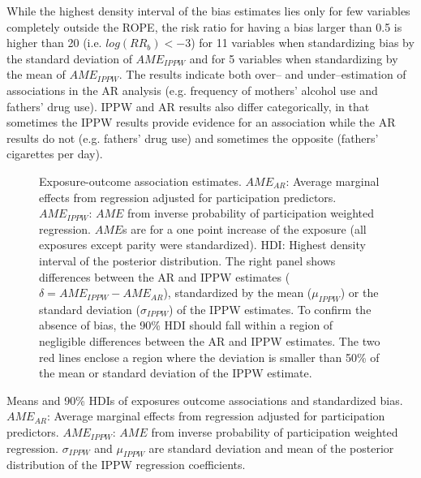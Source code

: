 \documentclass[12pt]{article}
\begin{document}
While the highest density interval of the bias estimates lies only for few variables completely outside the ROPE, the risk ratio for having a bias larger than 0.5 is higher than 20 (i.e. $log(RR_b) < -3$) for 11 variables when standardizing bias by the standard deviation of $AME_{IPPW}$ and for 5 variables when standardizing by the mean of $AME_{IPPW}$. The results indicate both over-- and under--estimation of associations in the AR analysis (e.g. frequency of mothers' alcohol use and fathers' drug use). IPPW and AR results also differ categorically, in that sometimes the IPPW results provide evidence for an association while the AR results do not (e.g. fathers' drug use) and sometimes the opposite (fathers' cigarettes per day). 

\begin{figure}
	\centering
	\caption{Exposure-outcome association estimates. $AME_{AR}$: Average marginal effects from regression adjusted for participation predictors. $AME_{IPPW}$: $AME$ from inverse probability of participation weighted regression. $AME$s are for a one point increase of the exposure (all exposures except parity were standardized). HDI: Highest density interval of the posterior distribution. The right panel shows differences between the AR and IPPW estimates ($\delta = AME_{IPPW}-AME_{AR}$), standardized by the mean ($\mu_{IPPW}$) or the standard deviation ($\sigma_{IPPW}$) of the IPPW estimates. To confirm the absence of bias, the 90\% HDI should fall within a region of negligible differences between the AR and IPPW estimates. The two red lines enclose a region where the deviation is smaller than 50\% of the mean or standard deviation of the IPPW estimate.}
	\label{fig:estimates}
\end{figure}


\begin{table}
	\caption{Means and 90\% HDIs of exposures outcome associations and standardized bias.
		$AME_{AR}$: Average marginal effects from regression adjusted for participation predictors. $AME_{IPPW}$: $AME$ from inverse probability of participation weighted regression. $\sigma_{IPPW}$ and $\mu_{IPPW}$ are standard deviation and mean of the posterior distribution of the IPPW regression coefficients.} 
	\label{table:estimates}
\end{table}
\end{document}
